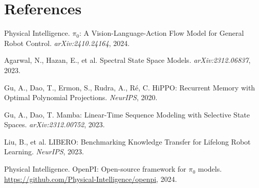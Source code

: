 \documentclass[10pt, letterpaper]{article}
\begin{document}
\section*{References}
\begin{enumerate}[leftmargin=1.5em, nosep, label={[\arabic*]}]
    \item Physical Intelligence. $\pi_0$: A Vision-Language-Action Flow Model for General Robot Control. \textit{arXiv:2410.24164}, 2024.
    \item Agarwal, N., Hazan, E., et al. Spectral State Space Models. \textit{arXiv:2312.06837}, 2023.
    \item Gu, A., Dao, T., Ermon, S., Rudra, A., R\'e, C. HiPPO: Recurrent Memory with Optimal Polynomial Projections. \textit{NeurIPS}, 2020.
    \item Gu, A., Dao, T. Mamba: Linear-Time Sequence Modeling with Selective State Spaces. \textit{arXiv:2312.00752}, 2023.
    \item Liu, B., et al. LIBERO: Benchmarking Knowledge Transfer for Lifelong Robot Learning. \textit{NeurIPS}, 2023.
    \item Physical Intelligence. OpenPI: Open-source framework for $\pi_0$ models. \url{https://github.com/Physical-Intelligence/openpi}, 2024.
\end{enumerate}
\end{document}
